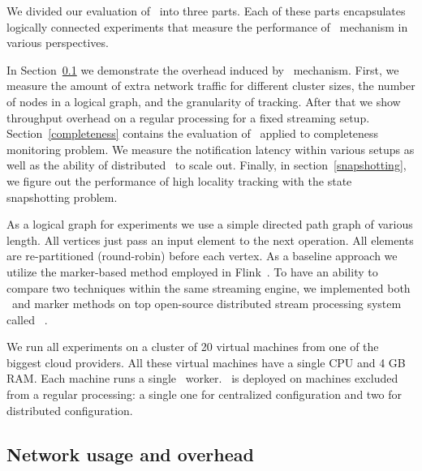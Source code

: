\label {fs-acker-experiments}

We divided our evaluation of \tracker\ into three parts. Each of these parts encapsulates logically connected experiments that measure the performance of \tracker\ mechanism in various perspectives.

In Section~\ref{overhead} we demonstrate the overhead induced by \tracker\ mechanism. First, we measure the amount of extra network traffic for different cluster sizes, the number of nodes in a logical graph, and the granularity of tracking. After that we show throughput overhead on a regular processing for a fixed streaming setup. Section~\ref{completeness} contains the evaluation of \tracker\ applied to completeness monitoring problem. We measure the notification latency within various setups as well as the ability of distributed \tracker\ to scale out. Finally, in section~\ref{snapshotting}, we figure out the performance of high locality tracking with the state snapshotting problem. 

As a logical graph for experiments we use a simple directed path graph of various length. All vertices just pass an input element to the next operation. All elements are re-partitioned (round-robin) before each vertex. As a baseline approach we utilize the marker-based method employed in Flink~\cite{Carbone:2017:SMA:3137765.3137777}. To have an ability to compare two techniques within the same streaming engine, we implemented both \tracker\ and marker methods on top open-source distributed stream processing system called \FlameStream\ .


We run all experiments on a cluster of 20 virtual machines from one of the biggest cloud providers. All these virtual machines have a single CPU and 4 GB RAM. Each machine runs a single \FlameStream\ worker.
\tracker\ is deployed on machines excluded from a regular processing: a single one for centralized configuration and two for distributed configuration.

\subsection{Network usage and overhead} \label{overhead}

